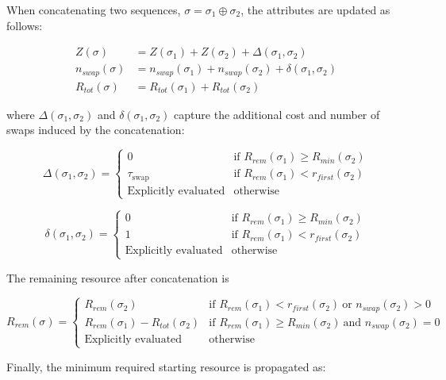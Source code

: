 \documentclass[3p, authoryear, 11pt]{elsarticle}
\begin{document}
When concatenating two sequences, $\sigma = \sigma_1 \oplus \sigma_2$, the attributes are updated as follows:

\[
\begin{aligned}
Z(\sigma) &= Z(\sigma_1) + Z(\sigma_2) + \Delta(\sigma_1,\sigma_2) \\
n_{swap}(\sigma) &= n_{swap}(\sigma_1) + n_{swap}(\sigma_2) + \delta(\sigma_1,\sigma_2) \\
R_{tot}(\sigma) &= R_{tot}(\sigma_1) + R_{tot}(\sigma_2)
\end{aligned}
\]

where $\Delta(\sigma_1,\sigma_2)$ and $\delta(\sigma_1,\sigma_2)$ capture the additional cost and number of swaps induced by the concatenation:

\[
\Delta(\sigma_1,\sigma_2) =
\begin{cases}
0 & \text{if } R_{rem}(\sigma_1) \ge R_{min}(\sigma_2) \\

\tau_{\mathrm{swap}} & \text{if } R_{rem}(\sigma_1) < r_{first}(\sigma_2) \\

\text{Explicitly evaluated} & \text{otherwise}
\end{cases}
\]

\[
\delta(\sigma_1,\sigma_2) =
\begin{cases}
0 & \text{if } R_{rem}(\sigma_1) \ge R_{min}(\sigma_2) \\

1 & \text{if } R_{rem}(\sigma_1) < r_{first}(\sigma_2) \\

\text{Explicitly evaluated} & \text{otherwise}
\end{cases}
\]

The remaining resource after concatenation is

\[
R_{rem}(\sigma) =
\begin{cases}
R_{rem}(\sigma_2) 
& \text{if } R_{rem}(\sigma_1) < r_{first}(\sigma_2) \ \text{or } n_{swap}(\sigma_2) > 0 \\

R_{rem}(\sigma_1) - R_{tot}(\sigma_2) 
& \text{if } R_{rem}(\sigma_1) \ge R_{min}(\sigma_2) \ \text{and } n_{swap}(\sigma_2)=0 \\

\text{Explicitly evaluated} & \text{otherwise}
\end{cases}
\]

Finally, the minimum required starting resource is propagated as:
\end{document}
